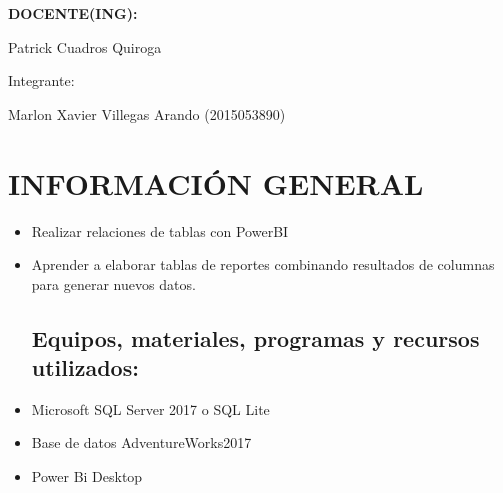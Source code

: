 \documentclass[12pt,letterpaper]{article}
\begin{document}
\begin{titlepage}
\begin{center}
\vspace*{0.3in}
\begin{Large}
\textbf{DOCENTE(ING):} \\
\end{Large}

\vspace*{0.1in}
\begin{large}
 Patrick Cuadros Quiroga\\
\end{large}

\vspace*{0.2in}
\vspace*{0.1in}
\begin{large}
Integrante: \\
\begin{flushleft}
Marlon Xavier Villegas Arando	\hfill	(2015053890) 
\end{flushleft}
\end{large}
\end{center}

\end{titlepage}



\thispagestyle{empty} %
\newpage
\setcounter{page}{1} %

\section{INFORMACIÓN GENERAL}
	\begin{itemize}
\subsection{Objetivos:}
	\item Realizar relaciones de tablas con PowerBI
	\item Aprender a elaborar tablas de reportes combinando resultados de columnas para generar nuevos datos.
\subsection{Equipos, materiales, programas y recursos utilizados:}
	\item Microsoft SQL Server 2017 o SQL Lite
	\item Base de datos AdventureWorks2017
	\item Power Bi Desktop
\end{itemize}
\end{document}

